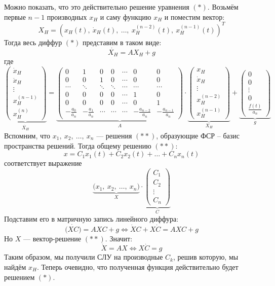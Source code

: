 \documentclass[a4paper,12pt]{article}
\renewcommand{\C}{\mathbb{C}}
\newcommand{\dx}{\dot{x}}
\newcommand{\ddx}{\ddot{x}}
\begin{document}
Можно показать, что это действительно решение уравнения $(*)$.
Возьмём первые $n - 1$ производных $x_H$ и саму функцию $x_H$ и поместим вектор:
\[X_H = \left(x_H(t),\ \dx_H(t),\ \ldots,\ x_H^{(n - 2)}(t),\ x_H^{(n - 1)}(t)\right)^T\]
Тогда весь диффур $(*)$ представим в таком виде:
\[\dot{X_H} = AX_H + g\] где
\[\underbrace{\begin{pmatrix}
\dx_H\\\ddx_H \\ \vdots\\ x_H^{(n - 1)}\\ x_H^{(n)}
\end{pmatrix}}_{\dot{X_H}} = \underbrace{\begin{pmatrix}
0 & 1 & 0 & 0 &\cdots & 0 & 0\\
0 & 0 & 1 & 0 & \cdots & 0 & 0\\
\cdots & \ddots & \ddots & \ddots & \cdots & \cdots & \cdots\\
0 & 0 & 0 & 0 & \cdots & 1 & 0\\
0 & 0 & 0 & 0 & \cdots & 0 & 1\\
-\frac{a_0}{a_n} & -\frac{a_1}{a_n} & \cdots &\cdots &\cdots & -\frac{a_{n - 2}}{a_n} & -\frac{a_{n - 1}}{a_n}
\end{pmatrix}}_{A} \cdot \underbrace{\begin{pmatrix}
x_H\\\dx_H \\ \vdots\\ x_H^{(n - 2)}\\x_H^{(n - 1)}
\end{pmatrix}}_{X_H} + \underbrace{\begin{pmatrix}
0 \\ 0 \\ \vdots \\ 0 \\ \frac{f(t)}{a_n}
\end{pmatrix}}_{g}\]
Вспомним, что $x_1,\ x_2,\ \ldots,\ x_n$ --- решения $(**)$, образующие ФСР -- базис пространства решений. Тогда общему решению $(**)$:
\[x = C_1x_1(t) + C_2x_2(t) + \ldots + C_nx_n(t)\]
соответствует выражение 
\[\underbrace{\big(x_1,\ x_2,\ \ldots,\ x_n\big)}_{X}\cdot \underbrace{\begin{pmatrix}
C_1\\C_2\\\vdots\\C_n
\end{pmatrix}}_{C}\]
Подставим его в матричную запись линейного диффура:
\[\dot{\big(XC\big)} = AXC + g\iff \dot{X}C + X\dot{C} = AXC + g\]
Но $X$ --- вектор-решение $(**)$. Значит:
\[\dot{X} = AX \iff X\dot{C} = g\]
Таким образом, мы получили СЛУ на производные $C_k$, решив которую, мы найдём $x_H$.
Теперь очевидно, что полученная функция действительно будет решением $(*)$.
\ \\
\end{document}
